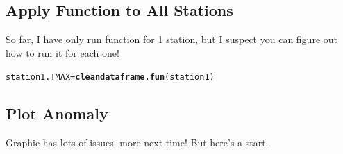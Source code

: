 \documentclass{article}\usepackage[]{graphicx}\usepackage[]{xcolor}
\makeatletter
\newcommand{\hlstd}[1]{\textcolor[rgb]{0.345,0.345,0.345}{#1}}%
\newcommand{\hlkwb}[1]{\textcolor[rgb]{0.69,0.353,0.396}{#1}}%
\newcommand{\hlkwd}[1]{\textcolor[rgb]{0.737,0.353,0.396}{\textbf{#1}}}%
\newenvironment{kframe}{%
 \def\at@end@of@kframe{}%
 \ifinner\ifhmode%
  \def\at@end@of@kframe{\end{minipage}}%
  \begin{minipage}{\columnwidth}%
 \fi\fi%
 \def\FrameCommand##1{\hskip\@totalleftmargin \hskip-\fboxsep
 \colorbox{shadecolor}{##1}\hskip-\fboxsep
     \hskip-\linewidth \hskip-\@totalleftmargin \hskip\columnwidth}%
 \MakeFramed {\advance\hsize-\width
   \@totalleftmargin\z@ \linewidth\hsize
   \@setminipage}}%
 {\par\unskip\endMakeFramed%
 \at@end@of@kframe}
\newenvironment{knitrout}{}{} %
\makeatother
\begin{document}
\subsection{Apply Function to All Stations}

So far, I have only run function for 1 station, but I suspect you can figure out how to run it for each one!

\begin{knitrout}
\color{fgcolor}\begin{kframe}
\begin{alltt}
\hlstd{station1.TMAX} \hlkwb{=} \hlkwd{cleandataframe.fun}\hlstd{(station1)}
\end{alltt}
\end{kframe}
\end{knitrout}

\subsection{Plot Anomaly}

Graphic has lots of issues. more next time!  But here's a start.
\end{document}
